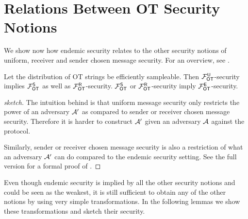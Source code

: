 \section{Relations Between OT Security Notions}\label{sec:relot}

We show now how endemic security relates to the other security notions of uniform, receiver and sender chosen message security. For an overview, see .
\begin{lemma}\label{lemma:is_a}
Let the distribution of OT strings be efficiently sampleable. 
Then $\mathcal{F}_{\mathsf{OT}}^\mathsf{U}$-security implies $\mathcal{F}_{\mathsf{OT}}^{\mathsf{S}}$ as well as $\mathcal{F}_{\mathsf{OT}}^\mathsf{R}$-security. $\mathcal{F}_{\mathsf{OT}}^{\mathsf{S}}$ or $\mathcal{F}_{\mathsf{OT}}^\mathsf{R}$-security imply $\mathcal{F}_{\mathsf{OT}}^\mathsf{E}$-security.
\end{lemma}

\iffullversion

\else
\begin{proof}[sketch]
	The intuition behind   is that uniform message security only restricts the power of an adversary $\mathcal{A}'$ as compared to sender or receiver chosen message security. Therefore it is harder to construct $\mathcal{A}'$ given an adversary $\mathcal{A}$ against the protocol.
	
	Similarly, sender or receiver chosen message security is also a restriction of what an adversary $\mathcal{A}'$ can do compared to the endemic security setting. 
	See \iffullversion {} \else the full version \fi for a formal proof of .\pe
\end{proof}
\fi



Even though endemic security is implied by all the other security notions and could be seen as the weakest, it is still sufficient to obtain any of the other notions by using very simple transformations. In the following lemmas we show these transformations and sketch their security.   

